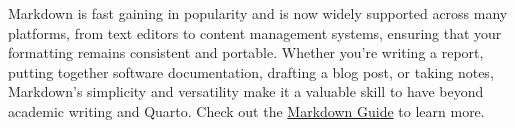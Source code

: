 \documentclass[
  letterpaper,
  DIV=11,
  numbers=noendperiod]{scrreprt}
\begin{document}
\begin{tcolorbox}[enhanced jigsaw, arc=.35mm, bottomrule=.15mm, bottomtitle=1mm, breakable, colback=white, colbacktitle=quarto-callout-note-color!10!white, colframe=quarto-callout-note-color-frame, coltitle=black, left=2mm, leftrule=.75mm, opacityback=0, opacitybacktitle=0.6, rightrule=.15mm, title=\textcolor{quarto-callout-note-color}{\faInfo}\hspace{0.5em}{The quiet force behind clean writing}, titlerule=0mm, toprule=.15mm, toptitle=1mm]

Markdown is fast gaining in popularity and is now widely supported
across many platforms, from text editors to content management systems,
ensuring that your formatting remains consistent and portable. Whether
you're writing a report, putting together software documentation,
drafting a blog post, or taking notes, Markdown's simplicity and
versatility make it a valuable skill to have beyond academic writing and
Quarto. Check out the
\href{https://www.markdownguide.org/basic-syntax/}{Markdown Guide} to
learn more.

\end{tcolorbox}
\end{document}
